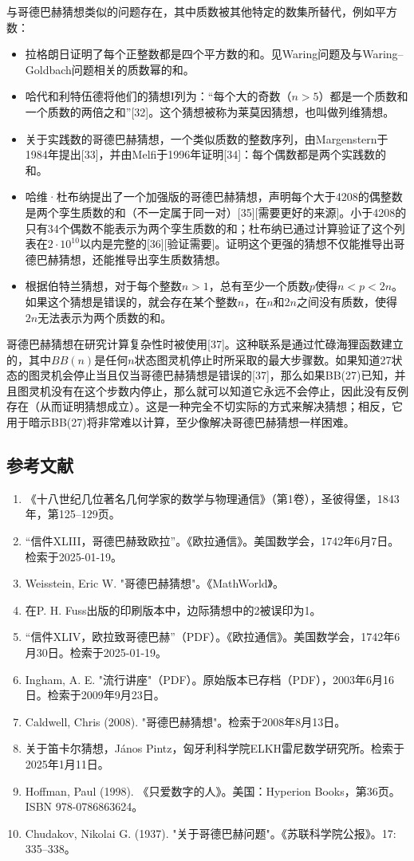 与哥德巴赫猜想类似的问题存在，其中质数被其他特定的数集所替代，例如平方数：
\begin{itemize}
\item 拉格朗日证明了每个正整数都是四个平方数的和。见Waring问题及与Waring–Goldbach问题相关的质数幂的和。
\item 哈代和利特伍德将他们的猜想I列为：“每个大的奇数（\(n > 5\)）都是一个质数和一个质数的两倍之和”[32]。这个猜想被称为莱莫因猜想，也叫做列维猜想。
\item 关于实践数的哥德巴赫猜想，一个类似质数的整数序列，由Margenstern于1984年提出[33]，并由Melfi于1996年证明[34]：每个偶数都是两个实践数的和。
\item 哈维·杜布纳提出了一个加强版的哥德巴赫猜想，声明每个大于4208的偶整数是两个孪生质数的和（不一定属于同一对）[35][需要更好的来源]。小于4208的只有34个偶数不能表示为两个孪生质数的和；杜布纳已通过计算验证了这个列表在\(2\cdot10^{10}\)以内是完整的[36][验证需要]。证明这个更强的猜想不仅能推导出哥德巴赫猜想，还能推导出孪生质数猜想。
\item 根据伯特兰猜想，对于每个整数\(n>1\)，总有至少一个质数\(p\)使得\(n<p <2n\)。如果这个猜想是错误的，就会存在某个整数\(n\)，在\(n\)和\(2n\)之间没有质数，使得\(2n\)无法表示为两个质数的和。
\end{itemize}
哥德巴赫猜想在研究计算复杂性时被使用[37]。这种联系是通过忙碌海狸函数建立的，其中\(BB(n)\)是任何\(n\)状态图灵机停止时所采取的最大步骤数。如果知道27状态的图灵机会停止当且仅当哥德巴赫猜想是错误的[37]，那么如果BB(27)已知，并且图灵机没有在这个步数内停止，那么就可以知道它永远不会停止，因此没有反例存在（从而证明猜想成立）。这是一种完全不切实际的方式来解决猜想；相反，它用于暗示BB(27)将非常难以计算，至少像解决哥德巴赫猜想一样困难。
\subsection{参考文献}  
\begin{enumerate}
\item 《十八世纪几位著名几何学家的数学与物理通信》（第1卷），圣彼得堡，1843年，第125–129页。  
\item “信件XLIII，哥德巴赫致欧拉”。《欧拉通信》。美国数学会，1742年6月7日。检索于2025-01-19。  
\item Weisstein, Eric W. "哥德巴赫猜想"。《MathWorld》。  
\item 在P. H. Fuss出版的印刷版本中，边际猜想中的2被误印为1。  
\item “信件XLIV，欧拉致哥德巴赫”（PDF）。《欧拉通信》。美国数学会，1742年6月30日。检索于2025-01-19。  
\item Ingham, A. E. "流行讲座"（PDF）。原始版本已存档（PDF），2003年6月16日。检索于2009年9月23日。  
\item Caldwell, Chris (2008). "哥德巴赫猜想"。检索于2008年8月13日。  
\item 关于笛卡尔猜想，János Pintz，匈牙利科学院ELKH雷尼数学研究所。检索于2025年1月11日。  
\item Hoffman, Paul (1998). 《只爱数字的人》。美国：Hyperion Books，第36页。ISBN 978-0786863624。  
\item Chudakov, Nikolai G. (1937). "关于哥德巴赫问题"。《苏联科学院公报》。17: 335–338。

\end{enumerate}



